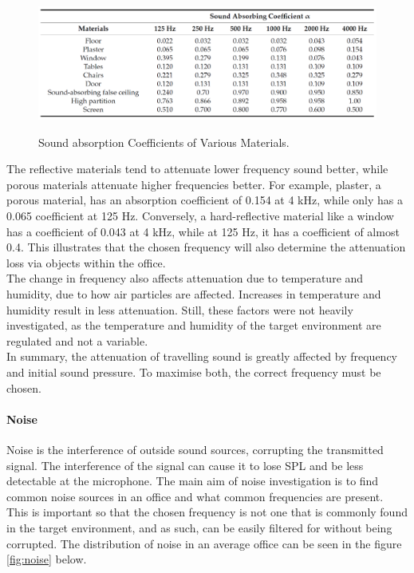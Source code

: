 \begin{figure}[H]
\centering
\noindent\includegraphics[width=13.48cm,height=4.5cm]{./images/matAtt.png}
\caption{Sound absorption Coefficients of Various Materials. \cite{openPlan}}
\label{fig:matAtt}
\end{figure}

The reflective materials tend to attenuate lower frequency sound better, while porous  materials attenuate higher frequencies better. For example, plaster, a porous material, has an absorption coefficient of 0.154 at 4 kHz, while only has a 0.065 coefficient at 125 Hz. Conversely, a hard-reflective material like a window has a coefficient of 0.043 at 4 kHz, while at 125 Hz, it has a coefficient of almost 0.4. This illustrates that the chosen frequency will also determine the attenuation loss via objects within the office. \\

The change in frequency also affects attenuation due to temperature and humidity, due to how air particles are affected. Increases in temperature and humidity result in less attenuation. Still, these factors were not heavily investigated, as the temperature and humidity of the target environment are regulated and not a variable. \\

In summary, the attenuation of travelling sound is greatly affected by frequency and initial sound pressure. To maximise both, the correct frequency must be chosen. 

\paragraph{Noise}

Noise is the interference of outside sound sources, corrupting the transmitted signal. The interference of the signal can cause it to lose SPL and be less detectable at the microphone. The main aim of noise investigation is to find common noise sources in an office and what common frequencies are present. This is important so that the chosen frequency is not one that is commonly found in the target environment, and as such, can be easily filtered for without being corrupted. The distribution of noise in an average office can be seen in the figure \ref{fig:noise} below. 

